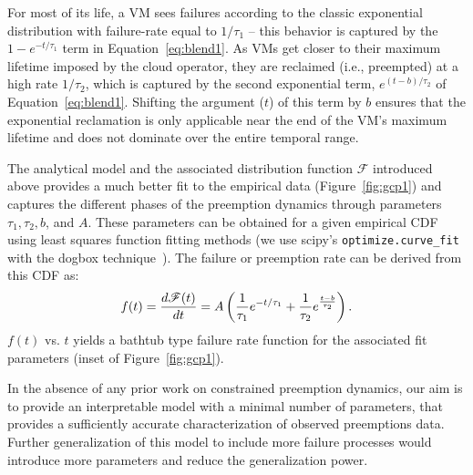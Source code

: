 


For most of its life, a VM sees failures according to the classic exponential distribution with failure-rate equal to $1/\tau_1$ -- this behavior is captured by the $1-e^{-t/\tau_1}$ term in Equation~\ref{eq:blend1}. 
As VMs get closer to their maximum lifetime imposed by the cloud operator, they are reclaimed (i.e., preempted) at a high rate $1/\tau_2$, which is captured by the second exponential term, $e^{(t-b)/\tau_2}$ of Equation~\ref{eq:blend1}. 
Shifting the argument ($t$) of this term by $b$ ensures that the exponential reclamation is only applicable near the end of the VM's maximum lifetime and does not dominate over the entire temporal range. 

The analytical model and the associated  distribution function $\mathscr{F}$ introduced above provides a much better fit to the empirical data (Figure~\ref{fig:gcp1}) and captures the different phases of the preemption dynamics through parameters $\tau_1, \tau_2, b$, and $A$. These parameters can be obtained for a given empirical CDF using least squares function fitting methods (we use scipy's \texttt{optimize.curve\_fit} with the dogbox technique~\cite{scipy-fit}). The failure or preemption rate can be derived from this CDF as:
\begin{equation}
  \label{eq:failrate}
    \vspace*{\eqnspace}
f(t) = \dfrac{d \mathscr{F}(t)} {dt} = A \left(\dfrac{1}{\tau_1}e^{-t/\tau_1} + \dfrac{1}{\tau_2}e^{\frac{t-b}{\tau_2}}\right).
\end{equation}
$f(t)$ vs. $t$ yields a bathtub type failure rate function for the associated fit parameters (inset of Figure~\ref{fig:gcp1}).


In the absence of any prior work on constrained preemption dynamics, our aim is to provide an interpretable model with a minimal number of parameters, that provides a sufficiently accurate characterization of observed preemptions data. 
Further generalization of this model to include more failure processes would introduce more parameters and reduce the generalization power. 


